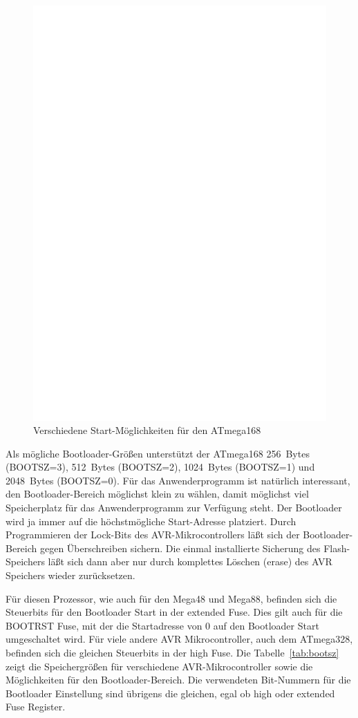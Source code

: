 \begin{figure}[H]
\centering
\includegraphics[width=12cm]{../FIG/boot_pages.eps}
\caption{Verschiedene Start-Möglichkeiten für den ATmega168}
\label{fig:pages}
\end{figure}


Als mögliche Bootloader-Größen unterstützt der ATmega168 256~Bytes (BOOTSZ=3),
512~Bytes (BOOTSZ=2), 1024~Bytes (BOOTSZ=1) und 2048~Bytes (BOOTSZ=0).
Für das Anwenderprogramm ist natürlich interessant, den Bootloader-Bereich
möglichst klein zu wählen, damit möglichst viel Speicherplatz für das
Anwenderprogramm zur Verfügung steht.
Der Bootloader wird ja immer auf die höchstmögliche Start-Adresse platziert.
Durch Programmieren der Lock-Bits des AVR-Mikrocontrollers läßt sich
der Bootloader-Bereich  gegen Überschreiben sichern. Die einmal installierte
Sicherung des Flash-Speichers läßt sich dann aber nur durch komplettes Löschen (erase)
des AVR Speichers wieder zurücksetzen.


Für diesen Prozessor, wie auch für den Mega48 und Mega88, befinden sich
die Steuerbits für den Bootloader Start in der extended Fuse.
Dies gilt auch für die BOOTRST Fuse, mit der die Startadresse von 0
auf den Bootloader Start umgeschaltet wird.
Für viele andere AVR Mikrocontroller, auch dem ATmega328, befinden sich
die gleichen Steuerbits in der high Fuse.
Die Tabelle~\ref{tab:bootsz} zeigt die Speichergrößen für verschiedene
AVR-Mikrocontroller sowie die Möglichkeiten für den Bootloader-Bereich. 
Die verwendeten Bit-Nummern für die Bootloader Einstellung sind übrigens
die gleichen, egal ob high oder extended Fuse Register.

